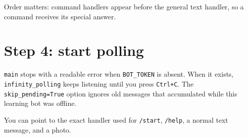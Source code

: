 Order matters: command handlers appear before the general text handler, so a
command receives its special answer.

\section{Step 4: start polling}

\texttt{main} stops with a readable error when \texttt{BOT\_TOKEN} is absent.
When it exists, \texttt{infinity\_}\allowbreak\texttt{polling} keeps listening until you press
\texttt{Ctrl+C}. The \texttt{skip\_}\allowbreak\texttt{pending=True} option ignores old messages
that accumulated while this learning bot was offline.

\begin{checkpointbox}
You can point to the exact handler used for \texttt{/start}, \texttt{/help}, a
normal text message, and a photo.
\end{checkpointbox}
